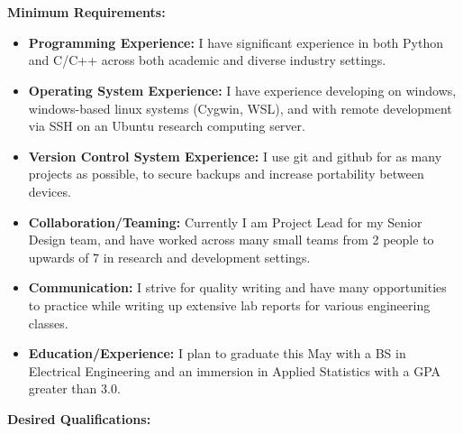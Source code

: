 \\\\
\textbf{Minimum Requirements:}
\begin{itemize}
    \item \textbf{Programming Experience:}  I have significant experience in both Python and C/C++ across both academic and diverse industry settings.

    \item \textbf{Operating System Experience:} I have experience developing on windows, windows-based linux systems (Cygwin, WSL), and with remote development via SSH on an Ubuntu research computing server.

    \item \textbf{Version Control System Experience:} I use git and github for as many projects as possible, to secure backups and increase portability between devices.

    \item \textbf{Collaboration/Teaming:} Currently I am Project Lead for my Senior Design team, and have worked across many small teams from 2 people to upwards of 7 in research and development settings.

    \item \textbf{Communication:} I strive for quality writing and have many opportunities to practice while writing up extensive lab reports for various engineering classes.

    \item \textbf{Education/Experience:} I plan to graduate this May with a BS in Electrical Engineering and an immersion in Applied Statistics with a GPA greater than 3.0.

\end{itemize}
\textbf{Desired Qualifications:}
